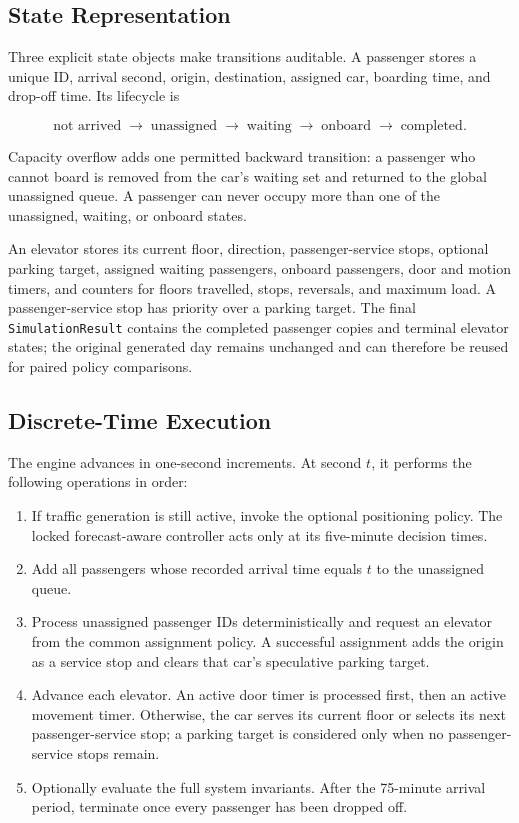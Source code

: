 \documentclass[12pt]{article}
\begin{document}
\subsection{State Representation}

Three explicit state objects make transitions auditable. A passenger stores a
unique ID, arrival second, origin, destination, assigned car, boarding time,
and drop-off time. Its lifecycle is

\begin{equation}
  \text{not arrived}\;\longrightarrow\;\text{unassigned}
  \;\longrightarrow\;\text{waiting}
  \;\longrightarrow\;\text{onboard}
  \;\longrightarrow\;\text{completed}.
  \label{eq:passenger-lifecycle}
\end{equation}

Capacity overflow adds one permitted backward transition: a passenger who
cannot board is removed from the car's waiting set and returned to the global
unassigned queue. A passenger can never occupy more than one of the
unassigned, waiting, or onboard states.

An elevator stores its current floor, direction, passenger-service stops,
optional parking target, assigned waiting passengers, onboard passengers,
door and motion timers, and counters for floors travelled, stops, reversals,
and maximum load. A passenger-service stop has priority over a parking target.
The final \texttt{SimulationResult} contains the completed passenger copies and
terminal elevator states; the original generated day remains unchanged and
can therefore be reused for paired policy comparisons.

\subsection{Discrete-Time Execution}

The engine advances in one-second increments. At second $t$, it performs the
following operations in order:

\begin{enumerate}[leftmargin=1.7em,itemsep=0.25em,topsep=0.35em]
  \item If traffic generation is still active, invoke the optional positioning
  policy. The locked forecast-aware controller acts only at its five-minute
  decision times.
  \item Add all passengers whose recorded arrival time equals $t$ to the
  unassigned queue.
  \item Process unassigned passenger IDs deterministically and request an
  elevator from the common assignment policy. A successful assignment adds
  the origin as a service stop and clears that car's speculative parking
  target.
  \item Advance each elevator. An active door timer is processed first, then
  an active movement timer. Otherwise, the car serves its current floor or
  selects its next passenger-service stop; a parking target is considered only
  when no passenger-service stops remain.
  \item Optionally evaluate the full system invariants. After the 75-minute
  arrival period, terminate once every passenger has been dropped off.
\end{enumerate}
\end{document}
